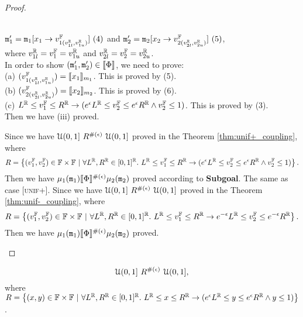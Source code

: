 \documentclass[a4paper,11pt]{article}
\begin{document}
\begin{proof}
\begin{itemize}
\begin{subproof}
	\\
	$\mathtt{m}_1' = \mathtt{m}_1[x_1 \to v^{\mathbb{F}}_{1(v^{\mathbb{R}}_{1l}, v^{\mathbb{R}}_{1u})}] ~ (4)$ and
	$\mathtt{m}_2' = \mathtt{m}_2[x_2 \to v^{\mathbb{F}}_{2(v^{\mathbb{R}}_{2l}, v^{\mathbb{R}}_{2u})}] ~ (5)$,
	\\
	where $v^{\mathbb{R}}_{1l} = v^{\mathbb{F}}_1 = v^{\mathbb{R}}_{1u}$ and $v^{\mathbb{R}}_{2l} = v^{\mathbb{F}}_2 = v^{\mathbb{R}}_{2u}$.
	\\
	In order to show $(\mathtt{m}_1', \mathtt{m}_2') \in \llbracket \Phi \rrbracket$, we need to prove:
	\\
	(a)	$(v^{\mathbb{F}}_{1(v^{\mathbb{R}}_{1l}, v^{\mathbb{R}}_{1u})}) = \llbracket x_1 \rrbracket_{m_1}$.
	This is proved by (5).
	\\
	(b) $(v^{\mathbb{F}}_{2(v^{\mathbb{R}}_{2l}, v^{\mathbb{R}}_{2u})}) = \llbracket x_2 \rrbracket_{m_2}$.
	This is proved by (6).
	\\
	(c) $L^{\mathbb{R}} \leq v^{\mathbb{F}}_1 \leq R^{\mathbb{R}} \rightarrow
	(e^{\epsilon} L^{\mathbb{R}} \leq v^{\mathbb{F}}_2 \leq 	e^{\epsilon} R^{\mathbb{R}}
	\land v^{\mathbb{F}}_2 \leq 1)$.
	This is proved by (3).
	\\
	Then we have (iii) proved. 
	\end{subproof}
	Since we have $\mathcal{U}(0,1] ~ R^{\#(\epsilon)} ~ \mathcal{U}(0,1]$ proved in the Theorem \ref{thm:unif+_coupling},
	where 
	\[
		R = 
		\left \{(v^{\mathbb{F}}_1, v^{\mathbb{F}}_2) \in \mathbb{F} \times \mathbb{F} 
		~|~
		\forall L^{\mathbb{R}}, R^{\mathbb{R}} \in [0,1]^{\mathbb{R}}. ~
		L^{\mathbb{R}} \leq v^{\mathbb{F}}_1 \leq R^{\mathbb{R}}
		\rightarrow
		(e^{\epsilon} L^{\mathbb{R}} \leq v^{\mathbb{F}}_2 \leq 	e^{\epsilon} R^{\mathbb{R}}
		\land v^{\mathbb{F}}_2 \leq 1)
		\right \}.
	\]	%
	Then we have $\mu_1(\mathtt{m}_1) \llbracket \Phi \rrbracket^{\#(\epsilon)} \mu_2(\mathtt{m}_2)$ proved according to \textbf{Subgoal}.
	The same as case [\textsc{unif+}].
		Since we have $\mathcal{U}(0,1] ~ R^{\#(\epsilon)} ~ \mathcal{U}(0,1]$ proved in the Theorem \ref{thm:unif-_coupling},
	where 
	\[
		R = 
		\left \{(v^{\mathbb{F}}_1, v^{\mathbb{F}}_2) \in \mathbb{F} \times \mathbb{F} 
		~|~
		\forall L^{\mathbb{R}}, R^{\mathbb{R}} \in [0,1]^{\mathbb{R}}. ~
		L^{\mathbb{R}} \leq v^{\mathbb{F}}_1 \leq R^{\mathbb{R}}
		\rightarrow
		e^{-\epsilon} L^{\mathbb{R}} \leq v^{\mathbb{F}}_2 \leq 	e^{-\epsilon} R^{\mathbb{R}}
		\right \}.
	\]
	Then we have $\mu_1(\mathtt{m}_1) \llbracket \Phi \rrbracket^{\#(\epsilon)} \mu_2(\mathtt{m}_2)$ proved.
	\end{itemize}
\end{proof}
%
%
\newpage
\begin{thm}
\label{thm:unif+_coupling}
%
$${\mathcal{U}(0,1]} ~ R^{\#(\epsilon)} ~ {\mathcal{U}(0,1]},$$
%
where
	$	R = 
		\left \{(x, y) \in {\mathbb{F}} \times {\mathbb{F}} 
		~|~
		\forall L^{\mathbb{R}}, R^{\mathbb{R}} \in [0,1]^{\mathbb{R}}. ~
		L^{\mathbb{R}} \leq x \leq R^{\mathbb{R}}
		\rightarrow
		(e^{\epsilon} L^{\mathbb{R}} \leq y \leq 	e^{\epsilon} R^{\mathbb{R}}
		\land y \leq 1)
		\right \}
		$.
\end{thm}
\end{document}
